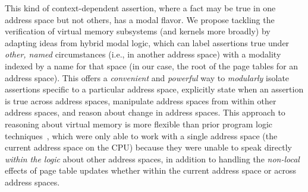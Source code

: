 This kind of context-dependent assertion, where a fact may be true in one address space but not others, has a modal flavor. 
We propose tackling the verification of virtual memory subsystems (and kernels more broadly) by adapting ideas from hybrid
modal logic, which can label assertions true under \emph{other, named} circumstances (i.e., in another address space) with a 
modality indexed by a name for that space (in our case, the root of the page tables for an address space). This offers a 
\textit{convenient} and \textit{powerful} way to \emph{modularly}
isolate assertions specific to a particular address space,
explicitly state when an assertion is true across address spaces,
manipulate address spaces from within other address spaces, and
reason about change in address spaces.
This approach to reasoning about virtual memory is more flexible than prior program logic techniques~\cite{kolanski08vstte,kolanski09tphols}, 
which were only able to work with a single address space (the current address space on the CPU) because they were unable
to speak directly \emph{within the logic} about other address spaces, in addition to handling
the \emph{non-local} effects of page table updates whether within the current address space or across address spaces.

